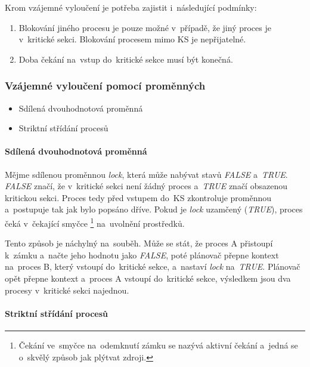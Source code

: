 Krom vzájemné vyloučení je potřeba zajistit i~následující podmínky:

\begin{enumerate}[noitemsep]
	\item Blokování jiného procesu je pouze možné v~případě, že jiný proces je v~kritické sekci. Blokování procesem mimo KS je nepřijatelné. 
	\item Doba čekání na~vstup do~kritické sekce musí být konečná.
\end{enumerate}

\subsubsection{Vzájemné vyloučení pomocí proměnných}

\begin{itemize}[noitemsep]
	\item Sdílená dvouhodnotová proměnná
	\item Striktní střídání procesů
\end{itemize}

\paragraph{Sdílená dvouhodnotová proměnná}

Mějme sdílenou proměnnou \emph{lock}, která může nabývat stavů \emph{FALSE} a~\emph{TRUE}. \emph{FALSE} značí, že v~kritické sekci není žádný proces a~\emph{TRUE} značí obsazenou kritickou sekci. Proces tedy před vstupem do~KS zkontroluje proměnnou a~postupuje tak jak bylo popsáno dříve. Pokud je \emph{lock} uzamčený (\emph{TRUE}), proces čeká v~čekající smyčce%
\footnote{Čekání ve~smyčce na~odemknutí zámku se nazývá aktivní čekání a~jedná se o~skvělý způsob jak plýtvat zdroji.}
na~uvolnění prostředků. 

Tento způsob je náchylný na~souběh. Může se stát, že proces A přistoupí k~zámku a~načte jeho hodnotu jako \emph{FALSE}, poté plánovač přepne kontext na~proces B, který vstoupí do~kritické sekce, a~nastaví \emph{lock} na~\emph{TRUE}. Plánovač opět přepne kontext a~proces A vstoupí do~kritické sekce, výsledkem jsou dva procesy v~kritické sekci najednou.

\paragraph{Striktní střídání procesů}

